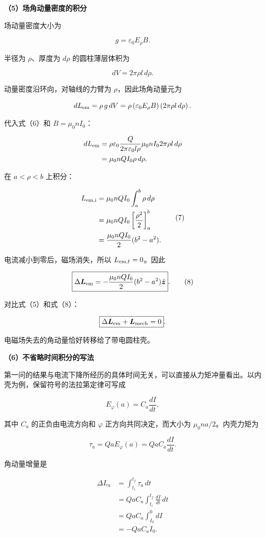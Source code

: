 \documentclass[12pt,a4paper,UTF8]{ctexart}
\begin{document}
\textbf{（5）场角动量密度的积分}

场动量密度大小为

\[
g=\varepsilon_0E_\rho B.
\]

半径为 \(\rho\)、厚度为 \(d\rho\) 的圆柱薄层体积为

\[
dV=2\pi\rho l\,d\rho.
\]

动量密度沿环向，对轴线的力臂为 \(\rho\)，因此场角动量元为

\[
dL_{\rm em}
=\rho\,g\,dV
=\rho\left(\varepsilon_0E_\rho B\right)
\left(2\pi\rho l\,d\rho\right).
\]

代入式（6）和 \(B=\mu_0nI_0\)：

\[
\begin{aligned}
dL_{\rm em}
&=\rho\varepsilon_0
\frac{Q}{2\pi\varepsilon_0l\rho}
\mu_0nI_0
2\pi\rho l\,d\rho\\
&=\mu_0nQI_0\rho\,d\rho.
\end{aligned}
\]

在 \(a<\rho<b\) 上积分：

\[
\begin{aligned}
L_{\rm em,i}
&=\mu_0nQI_0\int_a^b\rho\,d\rho\\
&=\mu_0nQI_0\left[\frac{\rho^2}{2}\right]_a^b\\
&=\frac{\mu_0nQI_0}{2}(b^2-a^2).
\end{aligned}\tag{7}
\]

电流减小到零后，磁场消失，所以 \(L_{\rm em,f}=0\)。因此

\[
\boxed{
\Delta\bm L_{\rm em}
=-\frac{\mu_0nQI_0}{2}(b^2-a^2)\hat{\bm z}
}.\tag{8}
\]

对比式（5）和式（8）：

\[
\boxed{
\Delta\bm L_{\rm em}+\bm L_{\rm mech}=0
}.
\]

电磁场失去的角动量恰好转移给了带电圆柱壳。

\textbf{（6）不省略时间积分的写法}

第一问的结果与电流下降所经历的具体时间无关，可以直接从力矩冲量看出。以内壳为例，保留符号的法拉第定律可写成

\[
E_\varphi(a)=C_a\frac{dI}{dt},
\]

其中 \(C_a\) 的正负由电流方向和 \(\varphi\) 正方向共同决定，而大小为
\(\mu_0na/2\)。内壳力矩为

\[
\tau_a=QaE_\varphi(a)
=QaC_a\frac{dI}{dt}.
\]

角动量增量是

\[
\begin{aligned}
\Delta L_a
&=\int_{t_i}^{t_f}\tau_a\,dt\\
&=QaC_a\int_{t_i}^{t_f}\frac{dI}{dt}\,dt\\
&=QaC_a\int_{I_0}^{0}dI\\
&=-QaC_aI_0.
\end{aligned}
\tag{9}
\]
\end{document}
